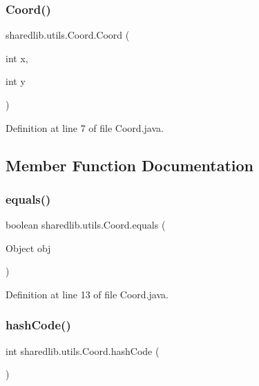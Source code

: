 \subsubsection{\texorpdfstring{Coord()}{Coord()}}
{\footnotesize\ttfamily sharedlib.\+utils.\+Coord.\+Coord (\begin{DoxyParamCaption}\item[{int}]{x,  }\item[{int}]{y }\end{DoxyParamCaption})}



Definition at line 7 of file Coord.\+java.



\subsection{Member Function Documentation}
\hypertarget{classsharedlib_1_1utils_1_1_coord_a017f238582d01dd9016a8ab221086952}{}\label{classsharedlib_1_1utils_1_1_coord_a017f238582d01dd9016a8ab221086952} 
\subsubsection{\texorpdfstring{equals()}{equals()}}
{\footnotesize\ttfamily boolean sharedlib.\+utils.\+Coord.\+equals (\begin{DoxyParamCaption}\item[{Object}]{obj }\end{DoxyParamCaption})}



Definition at line 13 of file Coord.\+java.

\hypertarget{classsharedlib_1_1utils_1_1_coord_a85806d6c4fa96af74e07e4135c023810}{}\label{classsharedlib_1_1utils_1_1_coord_a85806d6c4fa96af74e07e4135c023810} 
\subsubsection{\texorpdfstring{hash\+Code()}{hashCode()}}
{\footnotesize\ttfamily int sharedlib.\+utils.\+Coord.\+hash\+Code (\begin{DoxyParamCaption}{ }\end{DoxyParamCaption})}



